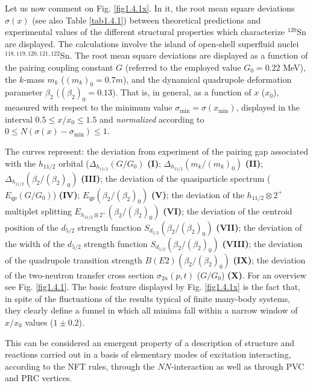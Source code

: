  Let us now  comment on Fig. \ref{fig1.4.1x}. In it, the root mean square deviations $\sigma(x)$ (see also Table \ref{tab1.4.1}) between theoretical predictions  and experimental values of the different structural properties which  characterize  $^{120}$Sn are displayed. The calculations involve the island of open-shell superfluid nuclei $^{118,119,120,121,122}$Sn. The root mean square deviations are displayed  as a function of the pairing coupling constant $G$ (referred to the employed value $G_0 = 0.22$ MeV), the $k$-mass $m_k$ ($(m_k)_0 = 0.7 m$),  and the dynamical quadrupole  deformation parameter $\beta_2$ ($(\beta_{2})_0 = 0.13$).  That is, in general, as a function of $x$ ($x_0$), measured with respect to the minimum value $\sigma_{\textrm{min}} = \sigma (x_{\textrm{min}})$, displayed in the interval $0.5 \leq x/x_0 \leq 1.5$ and \textit{normalized} according to $0 \leq N(\sigma(x) - \sigma_{\textrm{min}}) \leq 1$.
 
 
 The  curves represent: the deviation from experiment of the  pairing gap associated with the $h_{11/2}$ orbital 
 ($\Delta_{h_{11/2}} (G/G_0)$ \textbf{(I)};  
 $\Delta_{h_{11/2}} (m_k/(m_k)_0)$ \textbf{(II)};  $\Delta_{h_{11/2}} (\beta_{2}/(\beta_{2})_0)$ \textbf{(III)};
 the deviation of the quasiparticle spectrum ($E_{qp}(G/G_0)$) \textbf{(IV)};  $E_{qp}(\beta_{2}/(\beta_{2})_0)$ \textbf{(V)};
 the deviation of the $h_{11/2}\otimes 2^+$ multiplet splitting  $E_{h_{11/2}\otimes 2^+}(\beta_{2}/(\beta_{2})_0)$ \textbf{(VI)}; 
 the deviation of the  centroid position of the $d_{5/2}$ strength function $S_{d_{5/2}}(\beta_{2}/(\beta_{2})_0)$ \textbf{(VII)}; 
 the deviation of the width of the $d_{5/2}$ strength function  $S_{d_{5/2}} (\beta_{2}/(\beta_{2})_0)$ \textbf{(VIII)};
 the deviation  of the  quadrupole transition strength  $B(E2) (\beta_{2}/(\beta_{2})_0)$ \textbf{(IX)}; the deviation of the two-neutron transfer cross section $\sigma_{2n} (p,t)$ ($G/G_0$) \textbf{(X)}. For an overview see Fig. \ref{fig1.4.1}.
 The basic feature displayed by  Fig. \ref{fig1.4.1x} is the fact that, in spite of the fluctuations of the results typical of finite  many-body systems, they clearly define a funnel in which all minima fall within a narrow window of $x/x_0$ values ($1 \pm 0.2$). 
 
 This can be considered  an emergent property of a description of structure and reactions carried out in a basis of elementary modes of excitation interacting, according to the NFT rules, through the $NN$-interaction as well as through PVC and PRC vertices. 
 
